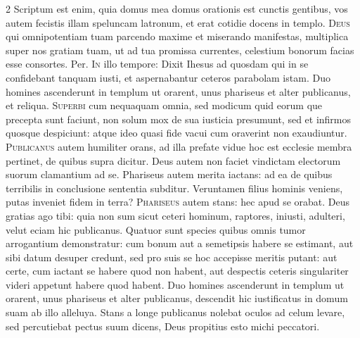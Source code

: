 \begin{multicols*}{2}
 Scriptum est enim, quia domus mea domus orationis est cunctis gentibus, vos autem fecistis illam speluncam latronum, et erat cotidie docens in templo.
\lettrine[lines=2]{\zallmancaps \color{Red} D}{eus} qui omnipotentiam tuam parcendo maxime et miserando manifestas, multiplica super nos gratiam tuam, ut ad tua promissa currentes, celestium bonorum facias esse consortes. Per.
\lettrine[lines=2]{\zallmancaps \color{Blue} I}{n} illo tempore: Dixit Ihesus ad quosdam qui in se confidebant tanquam iusti, et aspernabantur ceteros parabolam istam. Duo homines ascenderunt in templum ut orarent, unus phariseus et alter publicanus, et reliqua.
 \grecross
\lettrine[lines=2]{\zallmancaps \color{Red} S}{uperbi} cum nequaquam omnia, sed modicum quid eorum que precepta sunt faciunt, non solum mox de sua iusticia presumunt, sed et infirmos quosque despiciunt: atque ideo quasi fide vacui cum oraverint non exaudiuntur.
\lettrine[lines=2]{\zallmancaps \color{Blue} P}{ublicanus} autem humiliter orans, ad illa prefate vidue hoc est ecclesie membra pertinet, de quibus supra dicitur. Deus autem non faciet vindictam electorum suorum clamantium ad se. Phariseus autem merita iactans: ad ea de quibus terribilis in conclusione sententia subditur. Veruntamen filius hominis veniens, putas inveniet fidem in terra?
\lettrine[lines=2]{\zallmancaps \color{Red} P}{hariseus} autem stans: hec apud se orabat. Deus gratias ago tibi: quia non sum sicut ceteri hominum, raptores, iniusti, adulteri, velut eciam hic publicanus. Quatuor sunt species quibus omnis tumor arrogantium demonstratur: cum bonum aut a semetipsis habere se estimant, aut sibi datum desuper credunt, sed pro suis se hoc accepisse meritis putant: aut certe, cum iactant se habere quod non habent, aut despectis ceteris singulariter videri appetunt habere quod habent.
 Duo homines ascenderunt in templum ut orarent, unus phariseus et alter publicanus, descendit hic iustificatus in domum suam ab illo alleluya.
 Stans a longe publicanus nolebat oculos ad celum levare, sed percutiebat pectus suum dicens, Deus propitius esto michi peccatori.

\end{multicols*}
